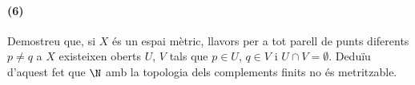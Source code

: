 \paragraph{(6)}
Demostreu que, si $X$ és un espai mètric, llavors per a tot parell de punts diferents $p \neq q$ a $X$ existeixen oberts $U$, $V$ tals que $p \in U$, $q \in V$ i $U \cap V = \emptyset$. Deduïu d'aquest fet que $\N$ amb la topologia dels complements finits no és metritzable.\\
